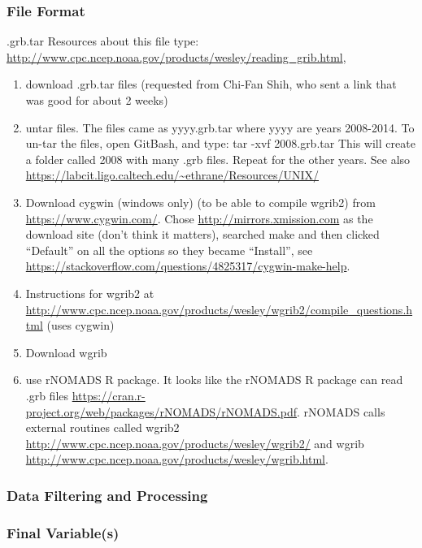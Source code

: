 \subsubsection*{File Format}

.grb.tar
Resources about this file type: \url{http://www.cpc.ncep.noaa.gov/products/wesley/reading_grib.html}, 


\begin{enumerate}
\item download .grb.tar files (requested from Chi-Fan Shih, who sent a link that was good for about 2 weeks)

\item untar files. The files came as yyyy.grb.tar where yyyy are years 2008-2014. To un-tar the files, open GitBash, and type: tar -xvf 2008.grb.tar This will create a folder called 2008 with many .grb files. Repeat for the other years. See also \url{https://labcit.ligo.caltech.edu/~ethrane/Resources/UNIX/}

\item Download cygwin (windows only) (to be able to compile wgrib2) from \url{https://www.cygwin.com/}. Chose \url{http://mirrors.xmission.com} as the download site (don't think it matters), searched make and then clicked ``Default'' on all the options so they became ``Install'', see \url{https://stackoverflow.com/questions/4825317/cygwin-make-help}.

\item Instructions for wgrib2 at \url{http://www.cpc.ncep.noaa.gov/products/wesley/wgrib2/compile_questions.html} (uses cygwin)

\item Download wgrib

\item use rNOMADS R package. It looks like the rNOMADS R package can read .grb files \url{https://cran.r-project.org/web/packages/rNOMADS/rNOMADS.pdf}. rNOMADS calls external routines called wgrib2 \url{http://www.cpc.ncep.noaa.gov/products/wesley/wgrib2/} and wgrib \url{http://www.cpc.ncep.noaa.gov/products/wesley/wgrib.html}.

\end{enumerate}



\subsubsection*{Data Filtering and Processing}
\subsubsection*{Final Variable(s)}
